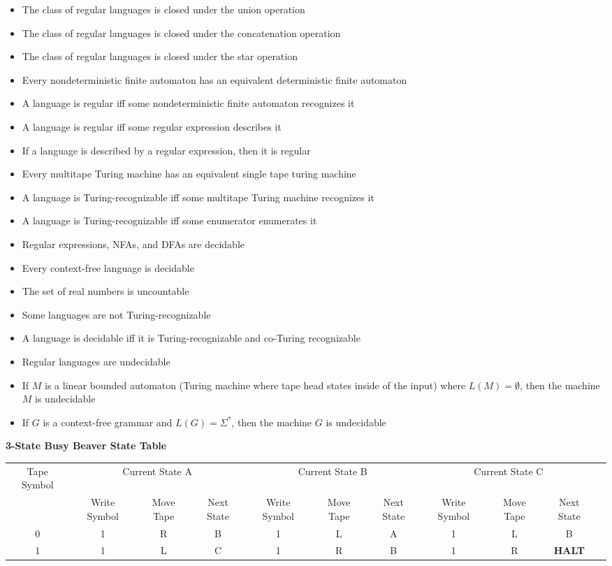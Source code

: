 \documentclass[8pt]{scrartcl}
\begin{document}
\begin{multicols}{6}
\begin{itemize}
    \item The class of regular languages is closed under the union operation
    \item The class of regular languages is closed under the concatenation operation
    \item The class of regular languages is closed under the star operation
    \item Every nondeterministic finite automaton has an equivalent deterministic finite automaton
    \item A language is regular iff some nondeterministic finite automaton recognizes it
    \item A language is regular iff some regular expression describes it
    \item If a language is described by a regular expression, then it is regular
    \item Every multitape Turing machine has an equivalent single tape turing machine
    \item A language is Turing-recognizable iff some multitape Turing machine recognizes it
    \item A language is Turing-recognizable iff some enumerator enumerates it
    \item Regular expressions, NFAs, and DFAs are decidable
    \item Every context-free language is decidable
    \item The set of real numbers is uncountable
    \item Some languages are not Turing-recognizable
    \item A language is decidable iff it is Turing-recognizable and co-Turing recognizable
    \item Regular languages are undecidable
    \item If $M$ is a linear bounded automaton (Turing machine where tape head states inside of the input) where $L(M) = \emptyset$, then the machine $M$ is undecidable
    \item If $G$ is a context-free grammar and $L(G) = \Sigma^*$, then the machine $G$ is undecidable
\end{itemize}

\end{multicols}


{\bf 3-State Busy Beaver State Table}

\begin{tabular}{|c|c|c|c|c|c|c|c|c|c|c|}
    \hline
    Tape Symbol & \multicolumn{3}{|c|}{Current State A} & \multicolumn{3}{|c|}{Current State B} & \multicolumn{3}{|c|}{Current State C} \\
    & Write Symbol & Move Tape & Next State & Write Symbol & Move Tape & Next State & Write Symbol & Move Tape & Next State\\
    \hline
    0 & 1 & R & B & 1 & L & A & 1 & L & B\\
    1 & 1 & L & C & 1 & R & B & 1 & R & {\bf HALT}\\
    \hline
\end{tabular}
\end{document}
